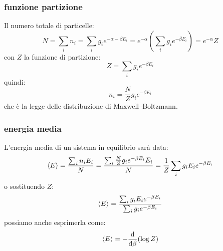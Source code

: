 \subsubsection{funzione partizione}
Il numero totale di particelle:
\begin{equation}
	N=\sum_i n_i=\sum_i g_i e^{-\alpha-\beta E_i}=e^{-\alpha}\left(\sum_i g_ie^{-\beta E_i}\right)=e^{-\alpha}Z
\end{equation}
con $Z$ la funzione di partizione:
\begin{equation}
	Z=\sum_i g_i e^{-\beta E_i}
\end{equation}
quindi:
\begin{equation}
	n_i=\frac{N}{Z}g_i e^{-\beta E_i}
	\label{ni_stat}
\end{equation}
che è la legge delle distribuzione di Maxwell--Boltzmann.
\subsubsection{energia media}
L'energia media di un sistema in equilibrio sarà data:
\begin{equation}
	\left<E\right>=\frac{\sum_i n_iE_i}{N}=\frac{\sum_i \frac{N}{Z}g_i e^{-\beta E_i}E_i}{N}=\frac{1}{Z}\sum_i g_i E_ie^{-\beta E_i}
\end{equation}
o sostituendo $Z$:
\begin{equation}
	\left<E\right>=\frac{\sum_i g_i E_ie^{-\beta E_i}}{\sum_i g_i e^{-\beta E_i}}
\end{equation}
possiamo anche esprimerla come:
\begin{equation}
	\left<E\right>=-\frac{\mathrm{d}}{\mathrm{d} \beta}(\log Z)
\end{equation}
